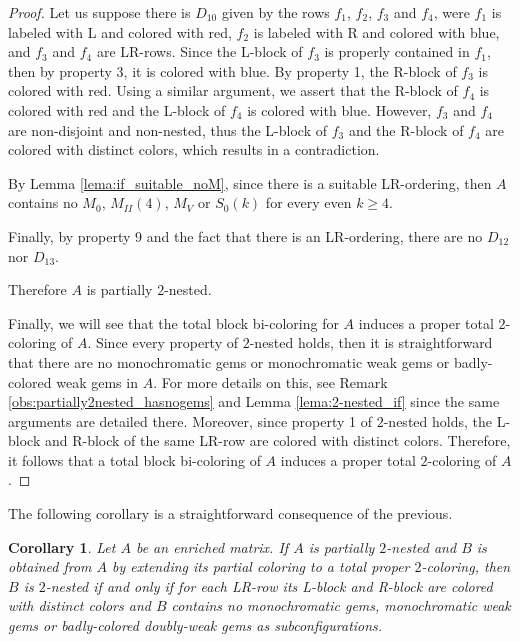 \documentclass[12pt]{book}
\theoremstyle{plain}
\newtheorem{cor}[teo]{Corollary}
\theoremstyle{remark}
\begin{document}
\begin{proof}
Let us suppose there is $D_{10}$ given by the rows $f_1$, $f_2$, $f_3$ and $f_4$, were $f_1$ is labeled with L and colored with red, $f_2$ is labeled with R and colored with blue, and $f_3$ and $f_4$ are LR-rows. 
Since the L-block of $f_3$ is properly contained in $f_1$, then by property 3, it is colored with blue. By property 1, the R-block of $f_3$ is colored with red. Using a similar argument, we assert that the R-block of $f_4$ is colored with red and the L-block of $f_4$ is colored with blue. However, $f_3$ and $f_4$ are non-disjoint and non-nested, thus the L-block of $f_3$ and the R-block of $f_4$ are colored with distinct colors, which results in a contradiction.

By Lemma \ref{lema:if_suitable_noM}, since there is a suitable LR-ordering, then $A$ contains  no $M_0$, $M_{II}(4)$, $M_V$ or $S_0(k)$ for every even $k \geq 4$. 

Finally, by property 9 and the fact that there is an LR-ordering, there are no $D_{12}$ nor $D_{13}$.

Therefore $A$ is partially $2$-nested.

\vspace{1mm}
Finally, we will see that the total block bi-coloring for $A$ induces a proper total $2$-coloring of $A$. 
Since every property of $2$-nested holds, then it is straightforward that there are no monochromatic gems or monochromatic weak gems or badly-colored weak gems in $A$. For more details on this, see Remark \ref{obs:partially2nested_hasnogems} and Lemma \ref{lema:2-nested_if} since the same arguments are detailed there. 
Moreover, since property 1 of $2$-nested holds, the L-block and R-block of the same LR-row are colored with distinct colors. Therefore, it follows that a total block bi-coloring of $A$ induces a proper total $2$-coloring of $A$. 

\end{proof}

\vspace{2mm}
The following corollary is a straightforward consequence of the previous.

\begin{cor} \label{lema:B_ext_2-nested} %
	Let $A$ be an enriched matrix. If $A$ is partially $2$-nested and $B$ is obtained from $A$ by extending its partial coloring to a total proper $2$-coloring, then $B$ is $2$-nested if and only if for each LR-row its L-block and R-block are colored with distinct colors and $B$ contains no monochromatic gems, monochromatic weak gems or badly-colored doubly-weak gems as subconfigurations.
	
	
\end{cor}
\end{document}
